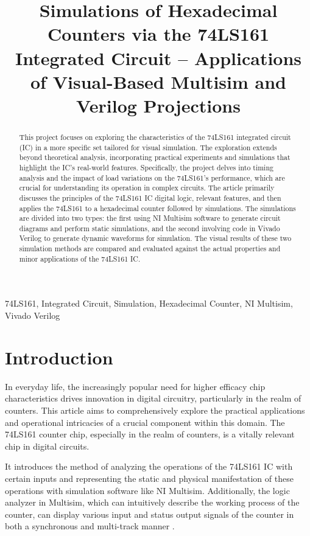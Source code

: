 \documentclass[conference]{IEEEtran}
\title{Simulations of Hexadecimal Counters via the 74LS161 Integrated Circuit -- Applications of Visual-Based Multisim and Verilog Projections}
\author{
    \IEEEauthorblockN{Xiangbo Cai\IEEEauthorrefmark{1}, Peter Pena\IEEEauthorrefmark{2}}
    \IEEEauthorblockA{\IEEEauthorrefmark{1}Department of Electrical \& Computer Engineering, Michigan State University, East Lansing, MI 48825, USA}
    \IEEEauthorblockA{\IEEEauthorrefmark{2}Department of Computer Science \& Engineering, Michigan State University, East Lansing, MI 48825, USA}
}
\begin{document}
\maketitle

\begin{abstract}
This project focuses on exploring the characteristics of the 74LS161 integrated circuit (IC) in a more specific set tailored for visual simulation. The exploration extends beyond theoretical analysis, incorporating practical experiments and simulations that highlight the IC's real-world features. Specifically, the project delves into timing analysis and the impact of load variations on the 74LS161's performance, which are crucial for understanding its operation in complex circuits. The article primarily discusses the principles of the 74LS161 IC digital logic, relevant features, and then applies the 74LS161 to a hexadecimal counter followed by simulations. The simulations are divided into two types: the first using NI Multisim software to generate circuit diagrams and perform static simulations, and the second involving code in Vivado Verilog to generate dynamic waveforms for simulation. The visual results of these two simulation methods are compared and evaluated against the actual properties and minor applications of the 74LS161 IC.
\end{abstract}

\begin{IEEEkeywords}
74LS161, Integrated Circuit, Simulation, Hexadecimal Counter, NI Multisim, Vivado Verilog
\end{IEEEkeywords}

\section{Introduction}
In everyday life, the increasingly popular need for higher efficacy chip characteristics drives innovation in digital circuitry, particularly in the realm of counters. This article aims to comprehensively explore the practical applications \cite{Long2024} and operational intricacies of a crucial component within this domain. The 74LS161 counter chip, especially in the realm of counters, is a vitally relevant chip in digital circuits.

It introduces the method of analyzing the operations of the 74LS161 IC with certain inputs and representing the static and physical manifestation of these operations with simulation software like NI Multisim. Additionally, the logic analyzer in Multisim, which can intuitively describe the working process of the counter, can display various input and status output signals of the counter in both a synchronous and multi-track manner \cite{Li2021}.
\end{document}
